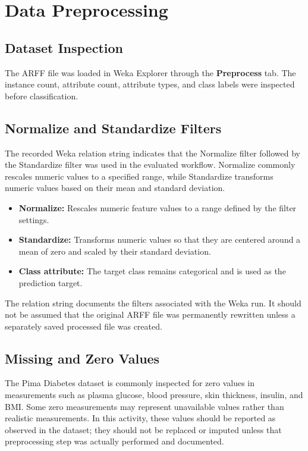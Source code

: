 \documentclass[11pt,a4paper]{article}
\begin{document}
\section{Data Preprocessing}
\subsection{Dataset Inspection}
The ARFF file was loaded in Weka Explorer through the \textbf{Preprocess} tab. The instance count, attribute count, attribute types, and class labels were inspected before classification.

\subsection{Normalize and Standardize Filters}
The recorded Weka relation string indicates that the Normalize filter followed by the Standardize filter was used in the evaluated workflow. Normalize commonly rescales numeric values to a specified range, while Standardize transforms numeric values based on their mean and standard deviation.

\begin{itemize}
    \item \textbf{Normalize:} Rescales numeric feature values to a range defined by the filter settings.
    \item \textbf{Standardize:} Transforms numeric values so that they are centered around a mean of zero and scaled by their standard deviation.
    \item \textbf{Class attribute:} The target class remains categorical and is used as the prediction target.
\end{itemize}

The relation string documents the filters associated with the Weka run. It should not be assumed that the original ARFF file was permanently rewritten unless a separately saved processed file was created.

\subsection{Missing and Zero Values}
The Pima Diabetes dataset is commonly inspected for zero values in measurements such as plasma glucose, blood pressure, skin thickness, insulin, and BMI. Some zero measurements may represent unavailable values rather than realistic measurements. In this activity, these values should be reported as observed in the dataset; they should not be replaced or imputed unless that preprocessing step was actually performed and documented.
\end{document}
